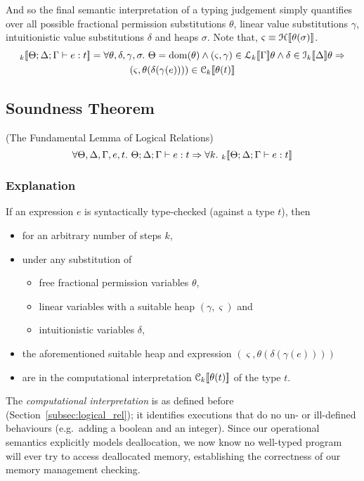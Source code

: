 And so the final semantic interpretation of a typing judgement simply
quantifies over all possible fractional permission substitutions $\theta$,
linear value substitutions $\gamma$, intuitionistic value substitutions
$\delta$ and heaps $\sigma$. Note that, $\varsigma \equiv \mathcal{H}_{} [\![ \theta(\sigma) ]\!]$.
\begin{align*}
\den{}{k}{ \Theta; \Delta ; \Gamma \vdash e : t } &= \forall \theta, \delta, \gamma, \sigma.\ \Theta = \dom(\theta) \wedge (\varsigma, \gamma) \in \den{L}{k}{ \Gamma }\theta \wedge \delta \in \den{I}{k}{ \Delta }\theta \Rightarrow \\
                                                  &  \qquad \qquad (\varsigma, \theta(\delta(\gamma(e)))) \in \C{k}{ \theta(t) }
\end{align*}

\subsection{Soundness Theorem}

\begin{theorem}
(The Fundamental Lemma of Logical Relations)
\[
    \forall \Theta, \Delta, \Gamma, e, t.\ \Theta; \Delta ; \Gamma \vdash e : t \Rightarrow
    \forall k.\ \mathcal{}_{k} [\![  \Theta; \Delta ; \Gamma \vdash e : t  ]\!]
\]
\end{theorem}

\subsubsection{Explanation}

If an expression $e$ is syntactically type-checked (against a type $t$), then
\begin{itemize}
    \item for an arbitrary number of steps $k$,
    \item under any substitution of
        \begin{itemize}
            \item free fractional permission variables $\theta$,
            \item linear variables with a suitable heap $(\gamma, \varsigma)$ and
            \item intuitionistic variables $\delta$,
        \end{itemize}
    \item the aforementioned suitable heap and expression $(\varsigma, \theta(\delta(\gamma(e))))$
    \item are in the computational interpretation $\mathcal{C}_{k} [\![  \theta(t)  ]\!]$ of the type $t$.
\end{itemize}
The \emph{computational interpretation} is as defined before
(Section~\ref{subsec:logical_rel}); it identifies executions that do no un- or
ill-defined behaviours (e.g.\ adding a boolean and an integer). Since our
operational semantics explicitly models deallocation, we now know no well-typed
program will ever try to access deallocated memory, establishing the
correctness of our memory management checking.

